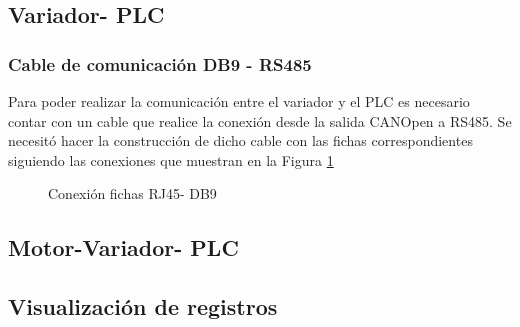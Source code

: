 \subsection{Variador- PLC}
\subsubsection{Cable de comunicación DB9 - RS485}
Para poder realizar la comunicación entre el variador y el PLC es necesario contar con un cable que realice la conexión desde la salida CANOpen a RS485. Se necesitó hacer la construcción de dicho cable con las fichas correspondientes siguiendo las conexiones que muestran en la Figura \ref{fig:cable}

\begin{figure}[htbp]
    \centering
    \caption{Conexión fichas RJ45- DB9} \label{fig:cable}
    \end{figure}

\subsection{Motor-Variador- PLC}
\subsection{Visualización de registros}